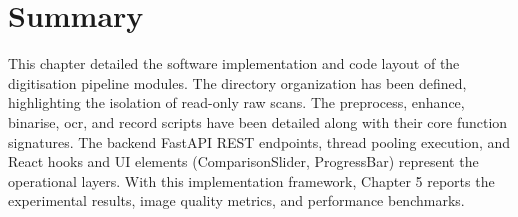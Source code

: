 \section*{Summary}

This chapter detailed the software implementation and code layout of the digitisation pipeline modules. The directory organization has been defined, highlighting the isolation of read-only raw scans. The preprocess, enhance, binarise, ocr, and record scripts have been detailed along with their core function signatures. The backend FastAPI REST endpoints, thread pooling execution, and React hooks and UI elements (ComparisonSlider, ProgressBar) represent the operational layers. With this implementation framework, Chapter 5 reports the experimental results, image quality metrics, and performance benchmarks.
